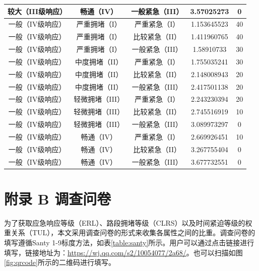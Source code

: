 \begin{center}
\begin{longtable}{|c|c|c|c|c|}
		较大（III级响应） &  畅通（IV）      &	 一般紧急（III）	    &    3.57025273    & 0   \\ \hline
		一般（IV级响应）  &   严重拥堵（I）  &	严重紧急（I）	      &    1.153645523	 & 40  \\ \hline
		一般（IV级响应）  &   严重拥堵（I）  &	比较紧急（II）	  &  1.411960765	 & 40  \\ \hline
		一般（IV级响应）  &   严重拥堵（I）  &	一般紧急（III）	  &  1.58910733	     & 30  \\ \hline
		一般（IV级响应）  &   中度拥堵（II） &  严重紧急（I）	      &      1.755035241 & 30  \\ \hline
		一般（IV级响应）  &   中度拥堵（II） &  比较紧急（II）       &  	2.148008943	 & 20  \\ \hline
		一般（IV级响应）  &   中度拥堵（II） &  一般紧急（III）      &  	2.417501138	 & 20  \\ \hline
		一般（IV级响应）  &   轻微拥堵（III）&  严重紧急（I）	      &      2.243230394 & 20  \\  \hline
		一般（IV级响应）  &   轻微拥堵（III）&  比较紧急（II）       &  	2.745516919	 & 10  \\ \hline
		一般（IV级响应）  &   轻微拥堵（III）&  一般紧急（III）      &  	3.089973297  & 0   \\ \hline
		一般（IV级响应）  &   畅通（IV）     &  严重紧急（I）        &  	  2.669926451  & 10  \\ \hline
		一般（IV级响应）  &   畅通（IV）     &  比较紧急（II）       &  	  3.267755404  & 0   \\ \hline
		一般（IV级响应）  &   畅通（IV）     &  一般紧急（III）      &  	  3.677732551  & 0   \\ \hline
	\end{longtable}
\end{center}

\chapter*{附录 B 调查问卷}
\setcounter{table}{0}
\renewcommand{\thetable}{B\arabic{table}}
\renewcommand\thefigure{\Alph{section}\arabic{figure}}

\renewcommand\thefigure{B\arabic{figure}}
\setcounter{figure}{0}    


为了获取应急响应等级（ERL）、路段拥堵等级（CLRS）以及时间紧迫等级的权重关系（TUL），本文采用调查问卷的形式来收集各属性之间的比重。调查问卷的填写遵循Santy 1-9标度方法，如表\ref{table:santy}所示。用户可以通过点击链接进行填写，链接地址为：\href{https://wj.qq.com/s2/10054077/2a68/}{https://wj.qq.com/s2/10054077/2a68/}。也可以扫描如图\ref{fig:qrcode}所示的二维码进行填写。

